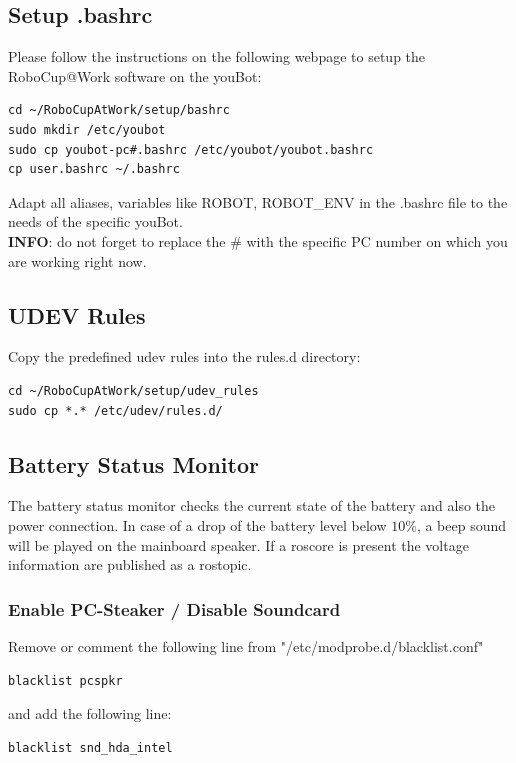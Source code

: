 \documentclass[a4paper,12pt]{article}
\begin{document}
\subsection{Setup .bashrc}
Please follow the instructions on the following webpage to setup the RoboCup@Work software on the youBot:
\begin{lstlisting}
cd ~/RoboCupAtWork/setup/bashrc
sudo mkdir /etc/youbot
sudo cp youbot-pc#.bashrc /etc/youbot/youbot.bashrc	    
cp user.bashrc ~/.bashrc
\end{lstlisting}

Adapt all aliases, variables like ROBOT, ROBOT\_ENV in the .bashrc file to the needs of the specific youBot.\\

\textbf{INFO}: do not forget to replace the \# with the specific PC number on which you are working right now.


\subsection{UDEV Rules}
Copy the predefined udev rules into the rules.d directory:
\begin{lstlisting}
cd ~/RoboCupAtWork/setup/udev_rules
sudo cp *.* /etc/udev/rules.d/
\end{lstlisting}



\subsection{Battery Status Monitor}
The battery status monitor checks the current state of the battery and also the power connection. In case of a drop of the battery level below $ 10\% $, a beep sound will be played on the mainboard speaker. If a roscore is present the voltage information are published as a rostopic. 

\subsubsection{Enable PC-Steaker / Disable Soundcard}
Remove or comment the following line from "/etc/modprobe.d/blacklist.conf"
\begin{lstlisting}
blacklist pcspkr
\end{lstlisting}
    
and add the following line:
\begin{lstlisting}
blacklist snd_hda_intel
\end{lstlisting}
    
\end{document}
